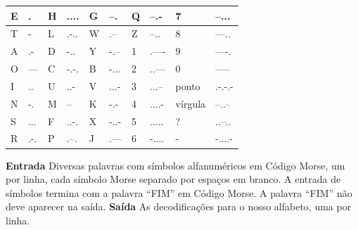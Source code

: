 \documentclass[a4paper, 12pt]{article}
\begin{document}
\renewcommand{\familydefault}{\ttdefault}
\begin{table}[H]
\centering
\begin{tabular}{|l|l|l|l|l|l|l|l|l|l|}
\hline
E & .   & H & .... & G & --.  & Q & --.-  & 7       & --...  \\ \hline
T & -   & L & .-.. & W & .--  & Z & --..  & 8       & ---..  \\ \hline
A & .-  & D & -..  & Y & -.-- & 1 & .---- & 9       & ----.  \\ \hline
O & --- & C & -.-. & B & -... & 2 & ..--- & 0       & -----  \\ \hline
I & ..  & U & ..-  & V & ...- & 3 & ...-- & ponto   & .-.-.- \\ \hline
N & -.  & M & --   & K & -.-  & 4 & ....- & vírgula & --..-- \\ \hline
S & ... & F & ..-. & X & -..- & 5 & ..... & ?       & ..--.. \\ \hline
R & .-. & P & .--. & J & .--- & 6 & -.... & -       & -....- \\ \hline
\end{tabular}
\end{table}

\renewcommand{\familydefault}{\rmdefault}
\noindent
\textbf{{\large Entrada}} \newline
Diversas palavras com símbolos alfanuméricos em Código Morse, um por linha, cada símbolo Morse separado por espaços em branco. 
\newline
A entrada de símbolos termina com a palavra “FIM” em Código Morse.
\newline
A palavra “FIM” não deve aparecer na saída.
\newline \newline
\textbf{{\large Saída}} \newline
As decodificações para o nosso alfabeto, uma por linha.\newline
\newline \newline
\newline
\end{document}
